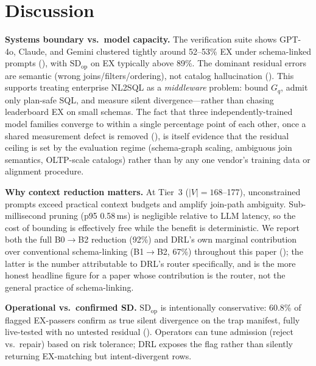 \documentclass[twocolumn]{svjour3}
\begin{document}
\section{Discussion}
\label{sec:discussion}

\textbf{Systems boundary vs.\ model capacity.}
The verification suite shows GPT-4o, Claude, and Gemini clustered tightly around 52--53\% EX under schema-linked prompts (), with $\text{SD}_{\text{op}}$ on EX typically above 89\%.
The dominant residual errors are semantic (wrong joins/filters/ordering), not catalog hallucination ().
This supports treating enterprise NL2SQL as a \emph{middleware} problem: bound $G_q$, admit only plan-safe SQL, and measure silent divergence---rather than chasing leaderboard EX on small schemas.
The fact that three independently-trained model families converge to within a single percentage point of each other, once a shared measurement defect is removed (), is itself evidence that the residual ceiling is set by the evaluation regime (schema-graph scaling, ambiguous join semantics, OLTP-scale catalogs) rather than by any one vendor's training data or alignment procedure.

\textbf{Why context reduction matters.}
At Tier~3 ($|V|{=}168$--177), unconstrained prompts exceed practical context budgets and amplify join-path ambiguity.
Sub-millisecond pruning (p95 0.58\,ms) is negligible relative to LLM latency, so the cost of bounding is effectively free while the benefit is deterministic.
We report both the full B0$\to$B2 reduction (92\%) and DRL's own marginal contribution over conventional schema-linking (B1$\to$B2, 67\%) throughout this paper (); the latter is the number attributable to DRL's router specifically, and is the more honest headline figure for a paper whose contribution is the router, not the general practice of schema-linking.

\textbf{Operational vs.\ confirmed SD.}
$\text{SD}_{\text{op}}$ is intentionally conservative: 60.8\% of flagged EX-passers confirm as true silent divergence on the trap manifest, fully live-tested with no untested residual ().
Operators can tune admission (reject vs.\ repair) based on risk tolerance; DRL exposes the flag rather than silently returning EX-matching but intent-divergent rows.
\end{document}
